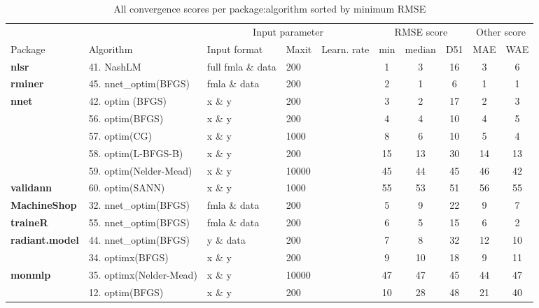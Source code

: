 \begin{Schunk}
\begin{table}[!h]

\caption{\label{tab:allscore}All convergence scores per package:algorithm sorted by minimum RMSE}
\centering
\fontsize{7}{9}\selectfont
\begin{tabular}[t]{>{}lllllccccc}
\toprule
\multicolumn{2}{c}{ } & \multicolumn{3}{c}{Input parameter} & \multicolumn{3}{c}{RMSE score} & \multicolumn{2}{c}{Other score} \\
\cmidrule(l{3pt}r{3pt}){3-5} \cmidrule(l{3pt}r{3pt}){6-8} \cmidrule(l{3pt}r{3pt}){9-10}
Package & Algorithm & Input format & Maxit & Learn. rate & min & median & D51 & MAE & WAE\\
\midrule
\textbf{nlsr} & 41. NashLM & full fmla \& data & 200 &  & 1 & 3 & 16 & 3 & 6\\
\cmidrule{1-10}
\textbf{rminer} & 45. nnet\_optim(BFGS) & fmla \& data & 200 &  & 2 & 1 & 6 & 1 & 1\\
\cmidrule{1-10}
\textbf{nnet} & 42. optim (BFGS) & x \& y & 200 &  & 3 & 2 & 17 & 2 & 3\\
\cmidrule{1-10}
 & 56. optim(BFGS) & x \& y & 200 &  & 4 & 4 & 10 & 4 & 5\\

 & 57. optim(CG) & x \& y & 1000 &  & 8 & 6 & 10 & 5 & 4\\

 & 58. optim(L-BFGS-B) & x \& y & 200 &  & 15 & 13 & 30 & 14 & 13\\

 & 59. optim(Nelder-Mead) & x \& y & 10000 &  & 45 & 44 & 45 & 46 & 42\\

\multirow{-5}{*}{\raggedright\arraybackslash \textbf{validann}} & 60. optim(SANN) & x \& y & 1000 &  & 55 & 53 & 51 & 56 & 55\\
\cmidrule{1-10}
\textbf{MachineShop} & 32. nnet\_optim(BFGS) & fmla \& data & 200 &  & 5 & 9 & 22 & 9 & 7\\
\cmidrule{1-10}
\textbf{traineR} & 55. nnet\_optim(BFGS) & fmla \& data & 200 &  & 6 & 5 & 15 & 6 & 2\\
\cmidrule{1-10}
\textbf{radiant.model} & 44. nnet\_optim(BFGS) & y \& data & 200 &  & 7 & 8 & 32 & 12 & 10\\
\cmidrule{1-10}
 & 34. optimx(BFGS) & x \& y & 200 &  & 9 & 10 & 18 & 9 & 11\\

\multirow{-2}{*}{\raggedright\arraybackslash \textbf{monmlp}} & 35. optimx(Nelder-Mead) & x \& y & 10000 &  & 47 & 47 & 45 & 44 & 47\\
\cmidrule{1-10}
 & 12. optim(BFGS) & x \& y & 200 &  & 10 & 28 & 48 & 21 & 40\\


\end{tabular}
\end{table}
\end{Schunk}
